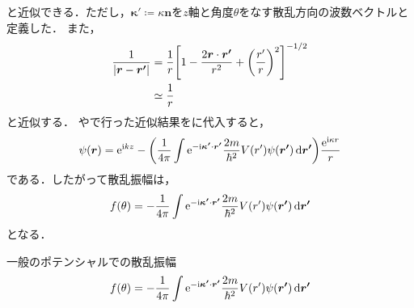 \documentclass{report}
\begin{document}
    と近似できる．ただし，$\bm{\kappa'} \coloneqq \kappa \bm{n}$を$z$軸と角度$\theta$をなす散乱方向の波数ベクトルと定義した．
    また，
    \begin{align}
      \frac{1}{\abs{\bm{r} - \bm{r'}}} &= \frac{1}{r}\qty[1 - \frac{2\bm{r}\cdot\bm{r'}}{r^2} + \qty(\frac{r'}{r})^2]^{-1/2} \\ 
      &\simeq \frac{1}{r}\label{abs-r-r-prime-inv-approx}
    \end{align}
    と近似する．%
    やで行った近似結果をに代入すると，
    \begin{align}
      \psi(\bm{r}) = \mathrm{e}^{\mathrm{i} kz} - \qty(\frac{1}{4\pi} \int \mathrm{e}^{-\mathrm{i}\bm{\kappa'}\cdot \bm{r'}} \frac{2m}{\hbar^2}V(r')\psi(\bm{r'})\dd{\bm{r'}})\frac{\mathrm{e}^{\mathrm{i}\kappa r}}{r}
    \end{align}
    である．したがって散乱振幅は，
    \begin{align}
      f(\theta) = -\frac{1}{4\pi} \int \mathrm{e}^{- \mathrm{i} \bm{\kappa'} \cdot \bm{r'}} \frac{2m}{\hbar^2}V(r')\psi(\bm{r'})\dd{\bm{r'}}
    \end{align}
    となる．
    \begin{itembox}[l]{一般のポテンシャルでの散乱振幅}
      \begin{align}
        f(\theta) = -\frac{1}{4\pi} \int \mathrm{e}^{- \mathrm{i} \bm{\kappa'} \cdot \bm{r'}} \frac{2m}{\hbar^2}V(r')\psi(\bm{r'})\dd{\bm{r'}}\label{scattering-amp-general}
      \end{align}
    \end{itembox}
\end{document}
